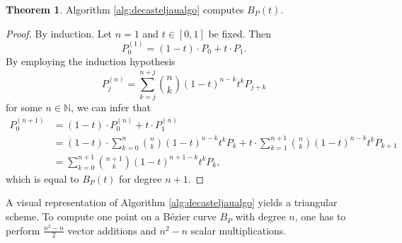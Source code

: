 \documentclass[a4paper, 11pt]{report}
\theoremstyle{definition}
\newtheorem{theorem}[definition]{Theorem}
\begin{document}
	\begin{theorem}
		Algorithm \ref{alg:decasteljaualgo} computes $B_P(t)$.
	\end{theorem}
	\begin{proof}
		By induction. Let $n = 1$ and $t \in [0,1]$ be fixed. Then
			$$ P_0^{(1)} = (1-t) \cdot P_0 + t \cdot P_1.$$
		By employing the induction hypothesis
			$$ P_j^{(n)} = \sum_{k=j}^{n+j} \binom{n}{k} (1-t)^{n-k}t^k P_{j+k}$$
		for some $n \in \mathbb{N}$, we can infer that
		\begin{align*}
			P_0^{(n+1)}	&= (1-t) \cdot P_0^{(n)} + t \cdot P_1^{(n)} \\
						&= (1-t) \cdot \sum_{k=0}^{n} \binom{n}{k} (1-t)^{n-k}t^k P_{k} + t \cdot \sum_{k=1}^{n+1} \binom{n}{k} (1-t)^{n-k}t^k P_{k+1} \\
						&= \sum_{k=0}^{n+1} \binom{n+1}{k} (1-t)^{n+1-k}t^k P_{k},
		\end{align*}
		which is equal to $B_P(t)$ for degree $n+1$.
	\end{proof}

	A visual representation of Algorithm \ref{alg:decasteljaualgo} yields a triangular scheme. To compute one point on a Bézier curve $B_P$ with degree $n$, one has to perform $\frac{n^2-n}{2}$ vector additions and $n^2-n$ scalar multiplications.
\end{document}
